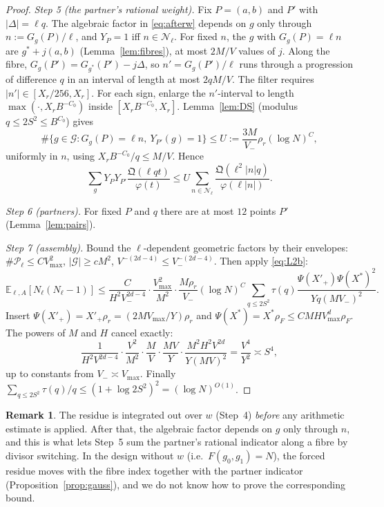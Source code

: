 \documentclass[11pt]{amsart}
\theoremstyle{definition}
\newtheorem{remark}[theorem]{Remark}
\newcommand{\cG}{\mathcal{G}}
\newcommand{\cN}{\mathcal{N}}
\newcommand{\cP}{\mathcal{P}}
\newcommand{\fQ}{\mathfrak{Q}}
\newcommand{\Vm}{V_{-}}
\newcommand{\VM}{V_{\max}}
\newcommand{\Xr}{X_{r}}
\newcommand{\XF}{X^{*}}
\newcommand{\rr}{\rho_r}
\newcommand{\rF}{\rho_F}
\newcommand{\Ex}{\mathbb{E}}
\begin{document}
\begin{proof}
\emph{Step 5 (the partner's rational weight).} Fix $P=(a,b)$ and $P'$ with $|\Delta|=\ell q$. The algebraic factor in \eqref{eq:afterw}
depends on $g$ only through $n:=G_g(P)/\ell$, and $Y_P=1$ iff $n\in\cN_\ell$. For fixed $n$, the $g$ with $G_g(P)=\ell n$ are
$g^*+j(a,b)$ (Lemma~\ref{lem:fibres}), at most $2M/V$ values of $j$. Along the fibre, $G_g(P')=G_{g^*}(P')-j\Delta$, so $n'=G_g(P')/\ell$ runs
through a progression of difference $q$ in an interval of length at most $2qM/V$. The filter requires $|n'|\in[\Xr/256,\Xr]$. For each sign,
enlarge the $n'$-interval to length $\max(\cdot,\Xr B^{-C_0})$ inside $[\Xr B^{-C_0},\Xr]$. Lemma~\ref{lem:DS} (modulus $q\le2S^2\le B^{C_0}$) gives
\[
\#\{g\in\cG:G_g(P)=\ell n,\ Y_{P'}(g)=1\}\le U:=\frac{3M}{\Vm}\rr(\log N)^C,
\]
uniformly in $n$, using $\Xr B^{-C_0}/q\le M/V$. Hence
\[
\sum_gY_PY_{P'}\frac{\fQ(\ell qt)}{\varphi(t)}\le U\sum_{n\in\cN_\ell}\frac{\fQ(\ell^2|n|q)}{\varphi(\ell|n|)}.
\]

\emph{Step 6 (partners).} For fixed $P$ and $q$ there are at most $12$ points $P'$ (Lemma~\ref{lem:pairs}).

\emph{Step 7 (assembly).} Bound the $\ell$-dependent geometric factors by their envelopes: $\#\cP_\ell\le C\VM^2$, $|\cG|\ge cM^2$,
$V^{-(2d-4)}\le\Vm^{-(2d-4)}$. Then apply \eqref{eq:L2b}:
\[
\Ex_{\ell,A}[N_\ell(N_\ell-1)]\le\frac{C}{H^2\Vm^{2d-4}}\cdot\frac{\VM^2}{M^2}\cdot\frac{M\rr}{\Vm}(\log N)^C\sum_{q\le2S^2}\tau(q)\frac{\Psi(X'_+)\Psi(\XF)^2}{Yq(M\Vm)^2}.
\]
Insert $\Psi(X'_+)=X'_+\rr=(2M\VM/Y)\rr$ and $\Psi(\XF)=\XF\rF\le CMH\VM^d\rF$. The powers of $M$ and $H$ cancel exactly:
\[
\frac1{H^2V^{2d-4}}\cdot\frac{V^2}{M^2}\cdot\frac MV\cdot\frac{MV}{Y}\cdot\frac{M^2H^2V^{2d}}{Y(MV)^2}=\frac{V^4}{Y^2}\asymp S^4,
\]
up to constants from $\Vm\asymp\VM$. Finally $\sum_{q\le2S^2}\tau(q)/q\le(1+\log2S^2)^2=(\log N)^{O(1)}$.
\end{proof}

\begin{remark}
The residue is integrated out over $w$ (Step~4) \emph{before} any arithmetic estimate is applied. After that, the
algebraic factor depends on $g$ only through $n$, and this is what lets Step~5 sum the partner's rational indicator along
a fibre by divisor switching. In the design without $w$ (i.e.\ $F(g_0,g_1)=N$), the forced residue moves with the fibre index together
with the partner indicator (Proposition~\ref{prop:gauss}), and we do not know how to prove the corresponding bound.
\end{remark}
\end{document}
